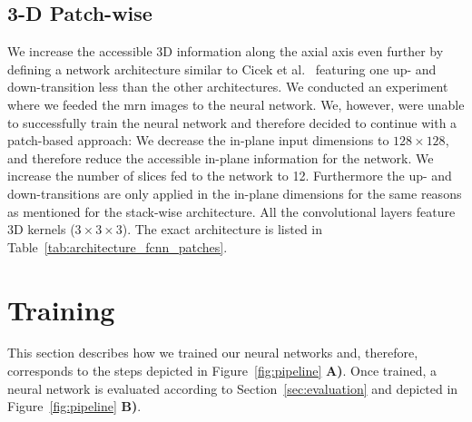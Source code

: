 \subsection{3-D Patch-wise}
We increase the accessible 3D information along the axial axis even further by defining a network architecture similar to Cicek et al.~\cite{Cicek20163DAnnotation} featuring one up- and down-transition less than the other architectures. We conducted an experiment where we feeded the \gls{mrn} images to the neural network. We, however, were unable to successfully train the neural network and therefore decided to continue with a patch-based approach: We decrease the in-plane input dimensions to $128 \times 128$, and therefore reduce the accessible in-plane information for the network. We increase the number of slices fed to the network to 12. Furthermore the up- and down-transitions are only applied in the in-plane dimensions for the same reasons as mentioned for the stack-wise architecture. All the convolutional layers feature 3D kernels ($3 \times 3 \times 3$). The exact architecture is listed in Table~\ref{tab:architecture_fcnn_patches}.

\section{Training} \label{sec:training}
This section describes how we trained our neural networks and, therefore, corresponds to the steps depicted in Figure~\ref{fig:pipeline} \textbf{A)}. Once trained, a neural network is evaluated according to Section~\ref{sec:evaluation} and depicted in Figure~\ref{fig:pipeline} \textbf{B)}.

